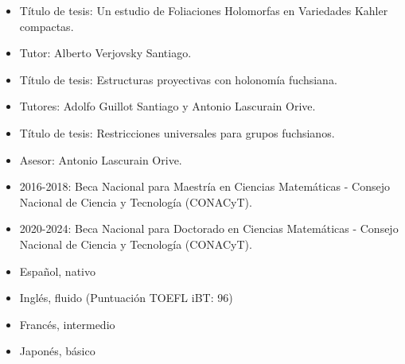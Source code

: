 \documentclass[10pt,a4paper,ragged2e,withhyper]{altacv}
\begin{document}
\begin{paracol}{2}
\divider


\begin{itemize}
\item Título de tesis: Un estudio de Foliaciones Holomorfas en Variedades Kahler compactas.
\item Tutor: Alberto Verjovsky Santiago.
\end{itemize}

\divider

\begin{itemize}
\item Título de tesis: Estructuras proyectivas con holonomía fuchsiana.
\item Tutores: Adolfo Guillot Santiago y Antonio Lascurain Orive.
\end{itemize}

\divider

\begin{itemize}
\item Título de tesis: Restricciones universales para grupos fuchsianos.
\item Asesor: Antonio Lascurain Orive.
\end{itemize}

\divider

\vspace{1cm}
\begin{itemize}
\item 2016-2018: Beca Nacional para Maestría en Ciencias Matemáticas - Consejo Nacional de Ciencia y Tecnología (CONACyT).
\item 2020-2024: Beca Nacional para Doctorado en Ciencias Matemáticas - Consejo Nacional de Ciencia y Tecnología (CONACyT).
\end{itemize}


\begin{itemize}
\item Español, nativo
\item Inglés, fluido (Puntuación TOEFL iBT: 96)
\item Francés, intermedio
\item Japonés, básico
\end{itemize}


\end{paracol}
\end{document}
